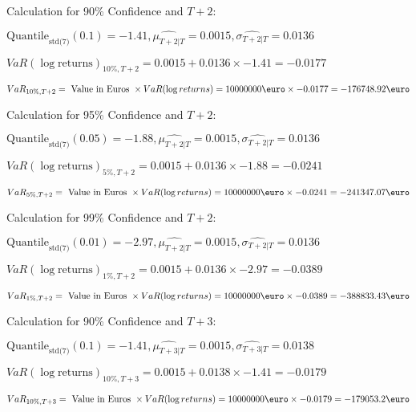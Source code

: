 Calculation for 90\% Confidence and $T+2$:

\indent\indent $\text{Quantile}_\text{std(7)}(0.1) = -1.41,\hat{\mu_{T+2|T}} = 0.0015, \hat{\sigma_{T+2|T}} = 0.0136$

\indent\indent $VaR(\log \text{returns})_{10\%, T + 2} = 0.0015 + 0.0136\times-1.41 = -0.0177$

\indent\indent $VaR_{10\%, T + 2} = \text{ Value in Euros } \times VaR(\log returns) = 10 000 000 \text{\euro} \times-0.0177 = -176748.92 \text{\euro}$\newline




Calculation for 95\% Confidence and $T+2$:

\indent\indent $\text{Quantile}_\text{std(7)}(0.05) = -1.88,\hat{\mu_{T+2|T}} = 0.0015, \hat{\sigma_{T+2|T}} = 0.0136$

\indent\indent $VaR(\log \text{returns})_{5\%, T + 2} = 0.0015 + 0.0136\times-1.88 = -0.0241$

\indent\indent $VaR_{5\%, T + 2} = \text{ Value in Euros } \times VaR(\log returns) = 10 000 000 \text{\euro} \times-0.0241 = -241347.07 \text{\euro}$\newline




Calculation for 99\% Confidence and $T+2$:

\indent\indent $\text{Quantile}_\text{std(7)}(0.01) = -2.97,\hat{\mu_{T+2|T}} = 0.0015, \hat{\sigma_{T+2|T}} = 0.0136$

\indent\indent $VaR(\log \text{returns})_{1\%, T + 2} = 0.0015 + 0.0136\times-2.97 = -0.0389$

\indent\indent $VaR_{1\%, T + 2} = \text{ Value in Euros } \times VaR(\log returns) = 10 000 000 \text{\euro} \times-0.0389 = -388833.43 \text{\euro}$\newline




Calculation for 90\% Confidence and $T+3$:

\indent\indent $\text{Quantile}_\text{std(7)}(0.1) = -1.41,\hat{\mu_{T+3|T}} = 0.0015, \hat{\sigma_{T+3|T}} = 0.0138$

\indent\indent $VaR(\log \text{returns})_{10\%, T + 3} = 0.0015 + 0.0138\times-1.41 = -0.0179$

\indent\indent $VaR_{10\%, T + 3} = \text{ Value in Euros } \times VaR(\log returns) = 10 000 000 \text{\euro} \times-0.0179 = -179053.2 \text{\euro}$\newline




